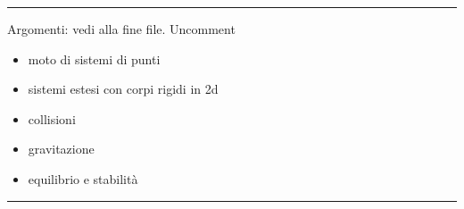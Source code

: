 \documentclass[letterpaper,10pt,italian]{jupyterBook}
\begin{document}
\bigskip\hrule\bigskip


\sphinxAtStartPar
Argomenti: vedi alla fine file. Uncomment
\begin{itemize}
\item {} 
\sphinxAtStartPar
moto di sistemi di punti

\item {} 
\sphinxAtStartPar
sistemi estesi con corpi rigidi in 2d

\item {} 
\sphinxAtStartPar
collisioni

\item {} 
\sphinxAtStartPar
gravitazione

\item {} 
\sphinxAtStartPar
equilibrio e stabilità

\end{itemize}


\bigskip\hrule\bigskip
\end{document}
